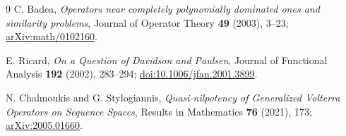 \documentclass[11pt]{article}
\begin{document}
\begin{thebibliography}{9}
C. Badea,
\emph{Operators near completely polynomially dominated ones and similarity
problems}, Journal of Operator Theory \textbf{49} (2003), 3--23;
\href{https://arxiv.org/abs/math/0102160}{arXiv:math/0102160}.

E. Ricard,
\emph{On a Question of Davidson and Paulsen},
Journal of Functional Analysis \textbf{192} (2002), 283--294;
\href{https://doi.org/10.1006/jfan.2001.3899}{doi:10.1006/jfan.2001.3899}.

N. Chalmoukis and G. Stylogiannis,
\emph{Quasi-nilpotency of Generalized Volterra Operators on Sequence Spaces},
Results in Mathematics \textbf{76} (2021), 173;
\href{https://arxiv.org/abs/2005.01660}{arXiv:2005.01660}.
\end{thebibliography}
\end{document}
